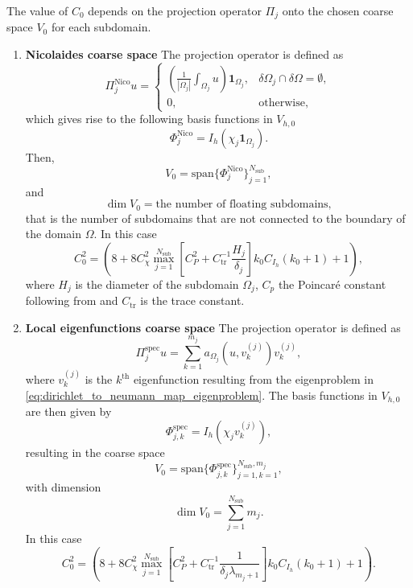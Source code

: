 The value of $C_0$ depends on the projection operator $\Pi_j$ onto the chosen coarse space $V_0$ for each subdomain.
\begin{enumerate}[label=\Roman*., ref=\textbf{ASM type \Roman* coarse space}]
    \item\label{ASM_coarse_space:nicolaides} \textbf{Nicolaides coarse space} The projection operator is defined as
    \begin{equation}
        \Pi_j^{\text{Nico}}u = \begin{cases}
            (\frac{1}{|\Omega_j|}\int_{\Omega_j} u)\mathbf{1}_{\Omega_j}, & \delta\Omega_j \cap \delta \Omega = \emptyset, \\
            0, & \text{otherwise},
        \end{cases}
        \label{eq:nicolaides_coarse_space_projection}
    \end{equation}
    which gives rise to the following basis functions in $V_{h,0}$
    \[
        \Phi^{\text{Nico}}_j = I_h(\chi_j \mathbf{1}_{\Omega_j}).
    \]
    Then,
    \[
        V_0 = \text{span}\{\Phi^{\text{Nico}}_j\}_{j=1}^{N_{\text{sub}}},
    \]
    and
    \[
        \dim V_0 = \text{the number of floating subdomains},
    \]
    that is the number of subdomains that are not connected to the boundary of the domain $\Omega$. In this case \cite[Theorem 5.16]{schwarz_methods_Dolean_2015}
    \begin{equation}
        C_0^{2} = \left(8 + 8 C_{\chi}^2 \max_{j=1}^{N_{\text{sub}}}\left[C_P^2 + C^{-1}_{\text{tr}}\frac{H_j}{\delta_j}\right]k_0 C_{I_h}(k_0 + 1) + 1\right),
        \label{eq:c0_nicolaides}
    \end{equation}
    where $H_j$ is the diameter of the subdomain $\Omega_j$, $C_p$ the Poincaré constant following from \cite[Lemma 5.18]{schwarz_methods_Dolean_2015} and $C_{\text{tr}}$ is the trace constant.
    \item\label{ASM_coarse_space:local_eigenfunctions} \textbf{Local eigenfunctions coarse space} The projection operator is defined as
    \[
        \Pi_j^{\text{spec}}u = \sum_{k=1}^{m_j} a_{\Omega_j}(u, v^{(j)}_k) v^{(j)}_k,
    \]
    where $v^{(j)}_k$ is the $k^{\text{th}}$ eigenfunction resulting from the eigenproblem in \cref{eq:dirichlet_to_neumann_map_eigenproblem}. The basis functions in $V_{h,0}$ are then given by
    \[
        \Phi^{\text{spec}}_{j,k} = I_h(\chi_j v^{(j)}_k),
    \]
    resulting in the coarse space
    \[
        V_0 = \text{span}\{\Phi^{\text{spec}}_{j,k}\}_{j=1,k=1}^{N_{\text{sub}},m_j},
    \]
    with dimension
    \[
        \dim V_0 = \sum_{j=1}^{N_{\text{sub}}} m_j.
    \]
    In this case \cite[Theorem 5.17]{schwarz_methods_Dolean_2015}
    \begin{equation}
        C_0^{2} = \left(8 + 8 C_{\chi}^2 \max_{j=1}^{N_{\text{sub}}}\left[C_P^2 + C^{-1}_{\text{tr}}\frac{1}{\delta_j\lambda_{m_j +1}}\right]k_0 C_{I_h}(k_0 + 1) + 1\right).
      \label{eq:c0_local_eigenfunctions}
    \end{equation}
\end{enumerate}